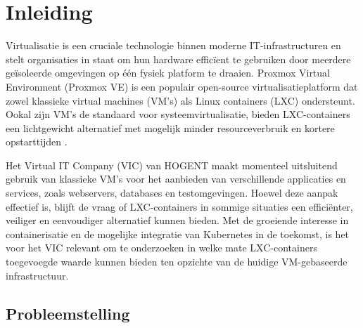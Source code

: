 





% 

\section{Inleiding}%
\label{sec:inleiding}



Virtualisatie is een cruciale technologie binnen moderne IT-infrastructuren en stelt organisaties in staat om hun hardware efficïent te gebruiken door meerdere geïsoleerde omgevingen op één fysiek platform te draaien. Proxmox Virtual Environment (Proxmox VE) is een populair open-source virtualisatieplatform dat zowel klassieke virtual machines (VM's) als Linux containers (LXC) ondersteunt. Ookal zijn VM's de standaard voor systeemvirtualisatie, bieden LXC-containers een lichtgewicht alternatief met mogelijk minder resourceverbruik en kortere opstarttijden \autocite{Merkel2014, Felter2015}.


Het Virtual IT Company (VIC) van HOGENT maakt momenteel uitsluitend gebruik van klassieke VM's voor het aanbieden van verschillende applicaties en services, zoals webservers, databases en testomgevingen. Hoewel deze aanpak effectief is, blijft de vraag of LXC-containers in sommige situaties een efficiënter, veiliger en eenvoudiger alternatief kunnen bieden. Met de groeiende interesse in containerisatie en de mogelijke integratie van Kubernetes in de toekomst, is het voor het VIC relevant om te onderzoeken in welke mate LXC-containers toegevoegde waarde kunnen bieden ten opzichte van de huidige VM-gebaseerde infrastructuur.

\subsection{Probleemstelling}

